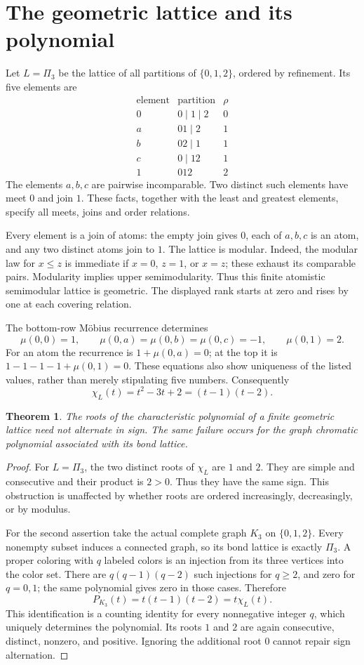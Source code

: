 \documentclass[11pt]{article}
\newtheorem{theorem}{Theorem}
\begin{document}
\section*{The geometric lattice and its polynomial}
Let $L=\Pi_3$ be the lattice of all partitions of $\{0,1,2\}$, ordered
by refinement. Its five elements are
\[
 \begin{array}{c|c|c}
 \text{element}&\text{partition}&\rho\\\hline
 0&0\mid1\mid2&0\\
 a&01\mid2&1\\
 b&02\mid1&1\\
 c&0\mid12&1\\
 1&012&2
 \end{array}
\]
The elements $a,b,c$ are pairwise incomparable. Two distinct such
elements have meet $0$ and join $1$. These facts, together with the
least and greatest elements, specify all meets, joins and order
relations.

Every element is a join of atoms: the empty join gives $0$, each of
$a,b,c$ is an atom, and any two distinct atoms join to $1$. The lattice
is modular. Indeed, the modular law for $x\leq z$ is immediate if
$x=0$, $z=1$, or $x=z$; these exhaust its comparable pairs. Modularity
implies upper semimodularity. Thus this finite atomistic semimodular
lattice is geometric. The displayed rank starts at zero and rises by
one at each covering relation.

The bottom-row M\"obius recurrence determines
\[
 \mu(0,0)=1,\qquad
 \mu(0,a)=\mu(0,b)=\mu(0,c)=-1,
 \qquad \mu(0,1)=2.
\]
For an atom the recurrence is $1+\mu(0,a)=0$; at the top it is
$1-1-1-1+\mu(0,1)=0$. These equations also show uniqueness of
the listed values, rather than merely stipulating five numbers.
Consequently
\[
 \chi_L(t)=t^2-3t+2=(t-1)(t-2).
\]

\begin{theorem}
The roots of the characteristic polynomial of a finite geometric
lattice need not alternate in sign. The same failure occurs for the
graph chromatic polynomial associated with its bond lattice.
\end{theorem}
\begin{proof}
For $L=\Pi_3$, the two distinct roots of $\chi_L$ are $1$ and $2$.
They are simple and consecutive and their product is $2>0$.
Thus they have the same sign. This obstruction is unaffected by
whether roots are ordered increasingly, decreasingly, or by modulus.

For the second assertion take the actual complete graph $K_3$ on
$\{0,1,2\}$. Every nonempty subset induces a connected graph, so
its bond lattice is exactly $\Pi_3$. A proper coloring with $q$ labeled
colors is an injection from its three vertices into the color set.
There are $q(q-1)(q-2)$ such injections for $q\geq2$, and zero
for $q=0,1$; the same polynomial gives zero in those cases. Therefore
\[
 P_{K_3}(t)=t(t-1)(t-2)=t\chi_L(t).
\]
This identification is a counting identity for every nonnegative
integer $q$, which uniquely determines the polynomial. Its roots
$1$ and $2$ are again consecutive, distinct, nonzero, and positive.
Ignoring the additional root $0$ cannot repair sign alternation.
\end{proof}
\end{document}
